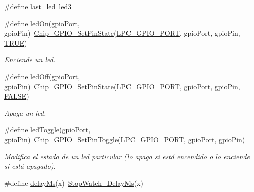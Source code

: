 \begin{DoxyCompactItemize}
\item 
\#define \hyperlink{group__hardware_ga6d4d3ee57587d8e08816b804150c29f8}{last\+\_\+led}~\hyperlink{group__hardware_gga2a000bf02da2abba53355f3fcfdb2d0ba16d63d90ec9dc8c27019e7c28ff1cfc0}{led3}
\item 
\#define \hyperlink{group__hardware_ga00c30099ff3ceab3e94a516833c11c98}{led\+On}(gpio\+Port,  gpio\+Pin)~\hyperlink{group___g_p_i_o__18_x_x__43_x_x_ga2d8db9f0a52f061d64e8cada713ae03e}{Chip\+\_\+\+G\+P\+I\+O\+\_\+\+Set\+Pin\+State}(\hyperlink{group___p_e_r_i_p_h__43_x_x___b_a_s_e_ga401a76842ea88d6e311bba578f43b259}{L\+P\+C\+\_\+\+G\+P\+I\+O\+\_\+\+P\+O\+RT}, gpio\+Port, gpio\+Pin, \hyperlink{group___l_p_c___types___public___types_gaa8cecfc5c5c054d2875c03e77b7be15d}{T\+R\+UE})
\begin{DoxyCompactList}\small\item\em Enciende un led. \end{DoxyCompactList}\item 
\#define \hyperlink{group__hardware_gac51bfbb3d5136e9e0479f3d8e6bb14de}{led\+Off}(gpio\+Port,  gpio\+Pin)~\hyperlink{group___g_p_i_o__18_x_x__43_x_x_ga2d8db9f0a52f061d64e8cada713ae03e}{Chip\+\_\+\+G\+P\+I\+O\+\_\+\+Set\+Pin\+State}(\hyperlink{group___p_e_r_i_p_h__43_x_x___b_a_s_e_ga401a76842ea88d6e311bba578f43b259}{L\+P\+C\+\_\+\+G\+P\+I\+O\+\_\+\+P\+O\+RT}, gpio\+Port, gpio\+Pin, \hyperlink{group___l_p_c___types___public___types_gaa93f0eb578d23995850d61f7d61c55c1}{F\+A\+L\+SE})
\begin{DoxyCompactList}\small\item\em Apaga un led. \end{DoxyCompactList}\item 
\#define \hyperlink{group__hardware_gaafb30c58d318e90ed902cb1aef013286}{led\+Toggle}(gpio\+Port,  gpio\+Pin)~\hyperlink{group___g_p_i_o__18_x_x__43_x_x_ga5437e5a8ae2ce7662b605f9961aad8f5}{Chip\+\_\+\+G\+P\+I\+O\+\_\+\+Set\+Pin\+Toggle}(\hyperlink{group___p_e_r_i_p_h__43_x_x___b_a_s_e_ga401a76842ea88d6e311bba578f43b259}{L\+P\+C\+\_\+\+G\+P\+I\+O\+\_\+\+P\+O\+RT}, gpio\+Port, gpio\+Pin)
\begin{DoxyCompactList}\small\item\em Modifica el estado de un led particular (lo apaga si está encendido o lo enciende si está apagado). \end{DoxyCompactList}\item 
\#define \hyperlink{group__hardware_gafdd074f68e5ae5b133575140014f918d}{delay\+Ms}(x)~\hyperlink{group___stop___watch_gaa3bfba465962b310e4a5bd18292e8f87}{Stop\+Watch\+\_\+\+Delay\+Ms}(x)

\end{DoxyCompactItemize}
